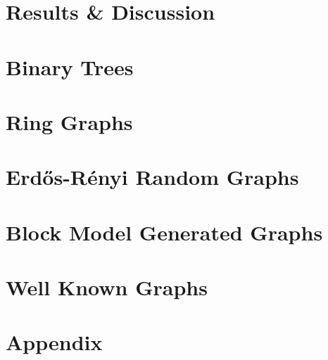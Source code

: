 \documentclass[twocolumn,twoside]{IEEEtran}
\begin{document}
\section*{Results \& Discussion}\label{sec:RD}



%
% 
%
%
%   

\newcommand{\inputsamepage}[1] {
    \begin{minipage}{\linewidth}
        
    \end{minipage}
}


\break
\section*{Binary Trees}


\break
\section*{Ring Graphs}


\break
\section*{Erd\H{o}s-R\'{e}nyi Random Graphs}


\section*{Block Model Generated Graphs}


\section*{Well Known Graphs}


\onecolumn
\section{Appendix}
 

\twocolumn
{}

\end{document}
